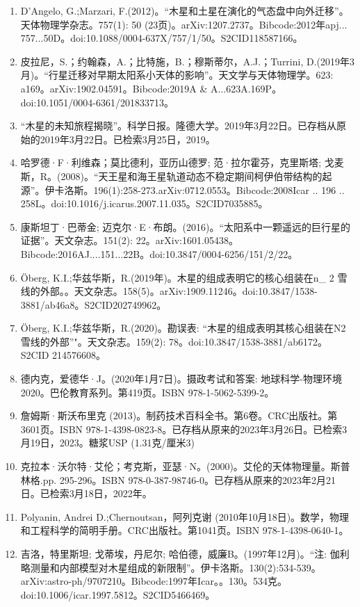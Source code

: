 \begin{enumerate}
\item D'Angelo, G.;Marzari, F.(2012)。“木星和土星在演化的气态盘中向外迁移”。天体物理学杂志。757(1): 50 (23页)。arXiv:1207.2737。Bibcode:2012年apj... 757...50D。doi:10.1088/0004-637X/757/1/50。S2CID118587166。 
\item 皮拉尼，S.；约翰森，A.；比特施，B.；穆斯蒂尔，A.J.；Turrini, D.(2019年3月)。“行星迁移对早期太阳系小天体的影响”。天文学与天体物理学。623: a169。arXiv:1902.04591。Bibcode:2019A & A...623A.169P。doi:10.1051/0004-6361/201833713。
\item “木星的未知旅程揭晓”。科学日报。隆德大学。2019年3月22日。已存档从原始的2019年3月22日。已检索3月25日，2019。
\item 哈罗德·F·利维森；莫比德利，亚历山德罗; 范·拉尔霍芬，克里斯塔; 戈麦斯，R。(2008)。“天王星和海王星轨道动态不稳定期间柯伊伯带结构的起源”。伊卡洛斯。196(1):258-273.arXiv:0712.0553。Bibcode:2008Icar .. 196 .. 258L。doi:10.1016/j.icarus.2007.11.035。S2CID7035885。 
\item 康斯坦丁·巴蒂金; 迈克尔·E·布朗。(2016)。“太阳系中一颗遥远的巨行星的证据”。天文杂志。151(2): 22。arXiv:1601.05438。Bibcode:2016AJ....151...22B。doi:10.3847/0004-6256/151/2/22。
\item Öberg, K.I.;华兹华斯，R.(2019年)。木星的组成表明它的核心组装在n_ {2} 雪线的外部。。天文杂志。158(5)。arXiv:1909.11246。doi:10.3847/1538-3881/ab46a8。S2CID202749962。 
\item Öberg, K.I.;华兹华斯，R.(2020)。勘误表: “木星的组成表明其核心组装在N2雪线的外部”"。天文杂志。159(2): 78。doi:10.3847/1538-3881/ab6172。S2CID 214576608。
\item 德内克，爱德华·J。(2020年1月7日)。摄政考试和答案: 地球科学-物理环境2020。巴伦教育系列。第419页。ISBN 978-1-5062-5399-2。
\item 詹姆斯·斯沃布里克 (2013)。制药技术百科全书。第6卷。CRC出版社。第3601页。ISBN 978-1-4398-0823-8。已存档从原来的2023年3月26日。已检索3月19日，2023。糖浆USP (1.31克/厘米3)
\item 克拉本·沃尔特·艾伦；考克斯，亚瑟·N。(2000)。艾伦的天体物理量。斯普林格.pp. 295-296。ISBN 978-0-387-98746-0。已存档从原来的2023年2月21日。已检索3月18日，2022年。
\item Polyanin, Andrei D.;Chernoutsan，阿列克谢 (2010年10月18日)。数学，物理和工程科学的简明手册。CRC出版社。第1041页。ISBN 978-1-4398-0640-1。
\item 吉洛，特里斯坦; 戈蒂埃，丹尼尔; 哈伯德，威廉B。(1997年12月)。“注: 伽利略测量和内部模型对木星组成的新限制”。伊卡洛斯。130(2):534-539。arXiv:astro-ph/9707210。Bibcode:1997年Icar。。130。534克。doi:10.1006/icar.1997.5812。S2CID5466469。 

\end{enumerate}

